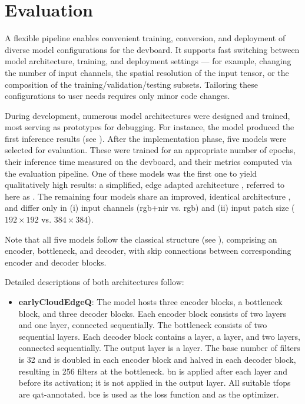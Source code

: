 {

\setlength{\parindent}{0pt}
\setlength{\parskip}{1em}

\chapter{Evaluation}
\label{chapter:evaluation}

A flexible pipeline enables convenient training, conversion, and deployment of diverse model configurations for the \gls{devboard}.
It supports fast switching between model architecture, training, and deployment settings --- for example, changing the number of input channels,
the spatial resolution of the input tensor, or the composition of the training/validation/testing subsets.
Tailoring these configurations to user needs requires only minor code changes.

During development, numerous model architectures were designed and trained, most serving as prototypes for debugging.
For instance, the  model produced the first inference results (see ).
After the implementation phase, five models were selected for evaluation.
These were trained for an appropriate number of epochs, their inference time measured on the \gls{devboard}, and their metrics computed via the evaluation pipeline.
One of these models was the first one to yield qualitatively high results: a simplified, edge adapted  architecture \cite{CloudNet2019},
referred to here as .
The remaining four models share an improved, identical architecture ,
and differ only in (i) input channels (\gls{rgb}+\gls{nir} vs. \gls{rgb}) and (ii) input patch size (\(192\times192\) vs. \(384\times384\)).

Note that all five models follow the classical  structure (see ), comprising an encoder,
bottleneck, and decoder, with skip connections between corresponding encoder and decoder blocks.

Detailed descriptions of both architectures follow:

\begin{itemize}[itemsep=0.5\baselineskip]
    \item \textbf{earlyCloudEdgeQ}: The model hosts three encoder blocks, a bottleneck block, and three decoder blocks.
    Each encoder block consists of two  layers and one  layer,
    connected sequentially. The bottleneck consists of two sequential  layers.
    Each decoder block contains a  layer, a  layer, and two  layers,
    connected sequentially. The output layer is a  layer.
    The base number of filters is 32 and is doubled in each encoder block and halved in each decoder block,
    resulting in 256 filters at the bottleneck.
    \gls{bn} is applied after each  layer and before its activation; it is not applied in the output layer.
    All suitable \glspl{tfop} are \gls{qat}-annotated. \gls{bce} is used as the loss function and  \cite{adam} as the optimizer.


\end{itemize}}
